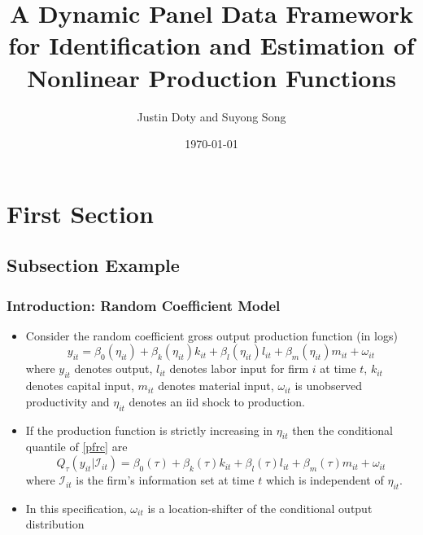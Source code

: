 \documentclass{beamer}
\title[Nonlinear Production Functions]{A Dynamic Panel Data Framework for Identification and Estimation of Nonlinear Production Functions}
\author{Justin Doty and Suyong Song} %
\institute[] %
{
\\  
\medskip %
}
\date{\today} %
\begin{document}
\begin{frame}
\titlepage %
\end{frame}


\section{First Section} %

\subsection{Subsection Example} %

\begin{frame}
\frametitle{Introduction: Random Coefficient Model}
\begin{itemize}
\item Consider the random coefficient gross output production function (in logs)
\begin{equation} \label{pfrc}
    y_{it}=\beta_{0}(\eta_{it})+\beta_{k}(\eta_{it})k_{it}+\beta_{l}(\eta_{it})l_{it}+\beta_{m}(\eta_{it})m_{it}+\omega_{it}
\end{equation}
where $y_{it}$ denotes output, $l_{it}$ denotes labor input for firm $i$ at time $t$, $k_{it}$ denotes capital input, $m_{it}$ denotes material input, $\omega_{it}$ is unobserved productivity and $\eta_{it}$ denotes an iid shock to production.
\item If the production function is strictly increasing in $\eta_{it}$ then the conditional quantile of \eqref{pfrc} are
\begin{equation}
Q_{\tau}(y_{it}|\mathcal{I}_{it})=\beta_{0}(\tau)+\beta_{k}(\tau)k_{it}+\beta_{l}(\tau)l_{it}+\beta_{m}(\tau)m_{it}+\omega_{it}
\end{equation}
where $\mathcal{I}_{it}$ is the firm's information set at time $t$ which is independent of $\eta_{it}$.
\item In this specification, $\omega_{it}$ is a location-shifter of the conditional output distribution
\end{itemize}
\end{frame}
\end{document}
